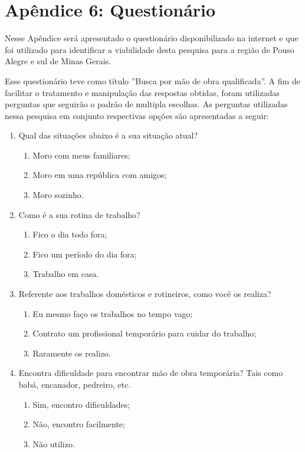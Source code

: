 \chapter*{Apêndice 6: Questionário}
\label{apendice:questionario}

Nesse Apêndice será apresentado o questionário disponibilizado na internet e que foi utilizado para identificar a viabilidade desta pesquisa para a região de Pouso Alegre e sul de Minas Gerais.

Esse questionário teve como título ''Busca por mão de obra qualificada''. A fim de facilitar o tratamento e manipulação das respostas obtidas, foram utilizadas perguntas que seguirão o padrão de multipla escolhas. As perguntas utilizadas nessa pesquisa em conjunto respectivas opções são apresentadas a seguir:

\begin{enumerate}
	\item Qual das situações abaixo é a sua situação atual?
	\begin{enumerate}[label=(\alph*)]
		\item Moro com meus familiares;
		\item Moro em uma república com amigos;
		\item Moro sozinho.
	\end{enumerate}
	
	\item Como é a sua rotina de trabalho?
	\begin{enumerate}[label=(\alph*)]
		\item Fico o dia todo fora;
		\item Fico um período do dia fora;
		\item Trabalho em casa.
	\end{enumerate}
	
	\item Referente aos trabalhos domésticos e rotineiros, como você os realiza?
	\begin{enumerate}[label=(\alph*)]
		\item Eu mesmo faço os trabalhos no tempo vago;
		\item Contrato um profissional temporário para cuidar do trabalho;
		\item Raramente os realizo.
	\end{enumerate}

	\item Encontra dificuldade para encontrar mão de obra temporária? Tais como babá, encanador, pedreiro, etc.
	\begin{enumerate}[label=(\alph*)]
		\item Sim, encontro dificuldades;
		\item Não, encontro facilmente;
		\item Não utilizo.
	\end{enumerate}
	

\end{enumerate}
